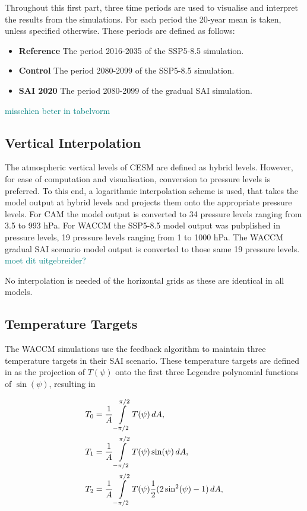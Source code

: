 Throughout this first part, three time periods are used to visualise and interpret the results from the simulations. For each period the 20-year mean is taken, unless specified otherwise. These periods are defined as follows:

\begin{itemize}
    \item \textbf{Reference} The period 2016-2035 of the SSP5-8.5 simulation.
    \item \textbf{Control} The period 2080-2099 of the SSP5-8.5 simulation.
    \item \textbf{SAI 2020} The period 2080-2099 of the gradual SAI simulation.
\end{itemize} 
\textcolor{teal}{misschien beter in tabelvorm}

\subsection{Vertical Interpolation}
The atmospheric vertical levels of CESM are defined as hybrid levels. However, for ease of computation and visualisation, conversion to pressure levels is preferred. To this end, a logarithmic interpolation scheme is used, that takes the model output at hybrid levels and projects them onto the appropriate pressure levels. For CAM the model output is converted to 34 pressure levels ranging from 3.5 to 993 hPa. For WACCM the SSP5-8.5 model output was pubplished in pressure levels, 19 pressure levels ranging from 1 to 1000 hPa. The WACCM gradual SAI scenario model output is converted to those same 19 pressure levels. \textcolor{teal}{moet dit uitgebreider?}

No interpolation is needed of the horizontal grids as these are identical in all models. 

\subsection{Temperature Targets}
The WACCM simulations use the feedback algorithm to maintain three temperature targets in their SAI scenario. These temperature targets are defined in \textcite{kravitz2016} as the projection of $T(\psi)$ onto the first three Legendre polynomial functions of $\sin(\psi)$, resulting in

\begin{equation}\label{eq:TdA}
    \begin{split}
        T_0 &= \frac{1}{A} \int\displaylimits_{-\pi/2}^{\pi/2} T(\psi) \mathop{dA},\\
        T_1 &= \frac{1}{A} \int\displaylimits_{-\pi/2}^{\pi/2} T(\psi) \sin(\psi) \mathop{dA,}\\
        T_2 &= \frac{1}{A} \int\displaylimits_{-\pi/2}^{\pi/2} T(\psi) \frac{1}{2}(2\sin^2(\psi) -1) \mathop{dA},
    \end{split}
\end{equation}

